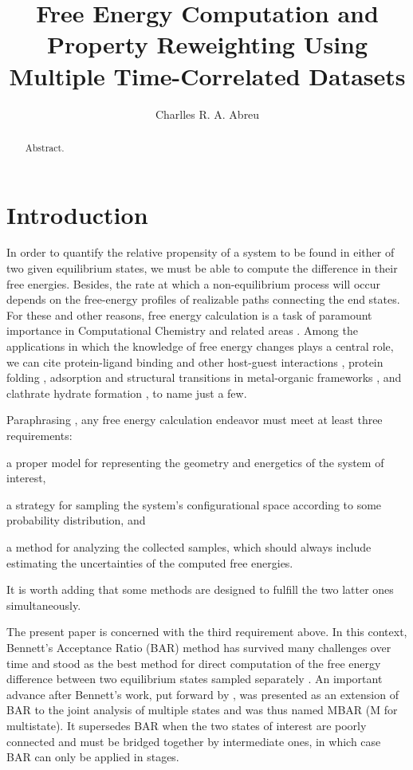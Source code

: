 \documentclass[journal=jctcce,manuscript=article,layout=twocolumn]{achemso}
\author{Charlles R. A. Abreu}
\affiliation{Chemical Engineering Department, Escola de Quimica, Universidade Federal do Rio de Janeiro, Rio de Janeiro, RJ 21941-909, Brazil}
\title{Free Energy Computation and Property Reweighting Using Multiple Time-Correlated Datasets}
\begin{document}


\begin{abstract}
Abstract.
\end{abstract}

\section{Introduction}
\label{sec:introduction}

In order to quantify the relative propensity of a system to be found in either of two given equilibrium states, we must be able to compute the difference in their free energies. Besides, the rate at which a non-equilibrium process will occur depends on the free-energy profiles of realizable paths connecting the end states. For these and other reasons, free energy calculation is a task of paramount importance in Computational Chemistry and related areas \cite{Chipot_2007, Christ_2010, Hansen_2014}. Among the applications in which the knowledge of free energy changes plays a central role, we can cite protein-ligand binding \cite{Chodera_2011, Abel_2017, Abel_2017_2, Cournia_2017, Mobley_2017} and other host-guest interactions \cite{X}, protein folding \cite{Perez_2016, X}, adsorption and structural transitions in metal-organic frameworks \cite{Coudert_2008, Bousquet_2012, Ghysels_2013, Demuynck_2017}, and clathrate hydrate formation \cite{X}, to name just a few.

Paraphrasing \citeauthor{Christ_2010} \cite{Christ_2010}, any free energy calculation endeavor must meet at least three requirements: \begin{enumerate*}[label = \arabic*)] \item a proper model for representing the geometry and energetics of the system of interest, \item a strategy for sampling the system's configurational space according to some probability distribution, and \item a method for analyzing the collected samples, which should always include estimating the uncertainties of the computed free energies.\end{enumerate*} It is worth adding that some methods are designed to fulfill the two latter ones simultaneously.

The present paper is concerned with the third requirement above. In this context, Bennett's Acceptance Ratio (BAR) method \cite{Bennett_1976} has survived many challenges over time and stood as the best method for direct computation of the free energy difference between two equilibrium states sampled separately \cite{Lu_2003, Shirts_2005}. An important advance after Bennett's work, put forward by \citeauthor{Shirts_2008} \cite{Shirts_2008}, was presented as an extension of BAR to the joint analysis of multiple states and was thus named MBAR (M for multistate). It supersedes BAR when the two states of interest are poorly connected and must be bridged together by intermediate ones, in which case BAR can only be applied in stages.
\end{document}
